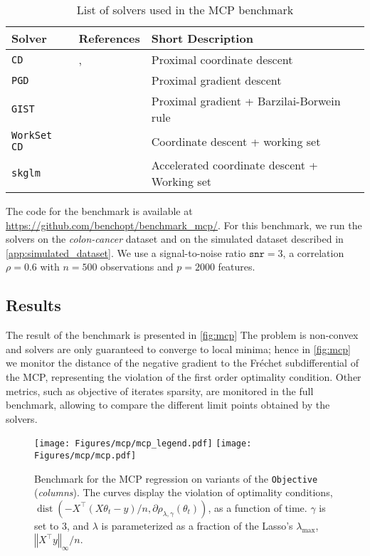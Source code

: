 \documentclass{article}
\newcommand{\repo}[1]{#1}
\newcommand{\norm}[1]{\left \Vert #1 \right \Vert}
\DeclareMathOperator{\dist}{dist}
\newlength{\figwidth}
\begin{document}
\begin{table}[h]
  \centering
  \small
  \caption{List of solvers used in the MCP benchmark}
\begin{tabular}{l p{5cm} l}
\toprule
  \textbf{Solver} & \textbf{References} & \textbf{Short Description} \\
  \midrule
  \texttt{CD} &\citet{breheny2011coordinate}, \citet{mazumder2011sparsenet}
                     & Proximal coordinate descent \\
   \texttt{PGD} &\citet{bolte2014proximal} &  Proximal gradient descent \\
 \texttt{GIST} & \citet{gong2013general} & Proximal gradient + Barzilai-Borwein rule \\
 \texttt{WorkSet CD} & \citet{boisbunon2014active}  & Coordinate descent + working set \\
 \texttt{skglm} & \citet{Bertrand_22} & Accelerated coordinate descent + Working set \\
  \bottomrule
\end{tabular}
\vskip -0.1in
\label{table:algo-mcp-benchmark}
\end{table}


\repo{The code for the benchmark is available at \url{https://github.com/benchopt/benchmark_mcp/}.}
For this benchmark, we run the solvers on the \emph{colon-cancer} dataset and on the simulated dataset described in \autoref{app:simulated_dataset}.
We use a signal-to-noise ratio $\texttt{snr}=3$, a correlation $\rho=0.6$ with $n=500$ observations and $p=2000$ features.


\subsection{Results}
The result of the benchmark is presented in \autoref{fig:mcp}
The problem is non-convex and solvers are only guaranteed to converge to local minima; hence in \autoref{fig:mcp} we monitor the distance of the negative gradient to the Fréchet subdifferential of the MCP, representing the violation of the first order optimality condition.
Other metrics, such as objective of iterates sparsity, are monitored in the full benchmark, allowing to compare the different limit points obtained by the solvers.


\begin{figure}[t]
    \centering
    \texttt{[image: Figures/mcp/mcp\_legend.pdf]}
    \texttt{[image: Figures/mcp/mcp.pdf]}
    \caption{
        Benchmark for the MCP regression on variants of the \texttt{Objective} (\emph{columns}).
        The curves display the violation of optimality conditions, $\dist(- X^\top (X \theta_t - y) / n, \partial \rho_{\lambda, \gamma}(\theta_t))$, as a function of time.
        $\gamma$ is set to 3, and $\lambda$ is parameterized as a fraction of the Lasso's $\lambda_{\max}$, $\norm{X^\top y}_\infty / n$.
    }
    \label{fig:mcp}
\end{figure}
\end{document}
